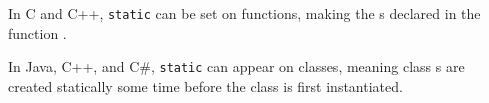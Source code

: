 \begin{remark*}
  In C and C++, \texttt{static} can be set on functions, making the s declared in the function .
\end{remark*}

\begin{remark*}
  In Java, C++, and C\#, \texttt{static} can appear on classes, meaning class s are created statically some time before the class is first instantiated.
\end{remark*}
